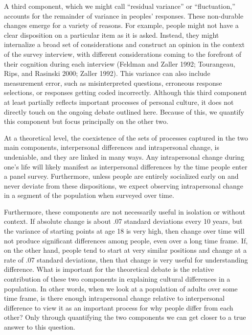 \documentclass[
  12pt,
]{article}
\begin{document}
A third component, which we might call ``residual variance'' or
``fluctuation,'' accounts for the remainder of variance in peoples'
responses. These non-durable changes emerge for a variety of reasons.
For example, people might not have a clear disposition on a particular
item as it is asked. Instead, they might internalize a broad set of
considerations and construct an opinion in the context of the survey
interview, with different considerations coming to the forefront of
their cognition during each interview (Feldman and Zaller 1992;
Tourangeau, Rips, and Rasinski 2000; Zaller 1992). This variance can
also include measurement error, such as misinterpreted questions,
erroneous response selections, or responses getting coded incorrectly.
Although this third component at least partially reflects important
processes of personal culture, it does not directly touch on the ongoing
debate outlined here. Because of this, we quantify this component but
focus principally on the other two.

At a theoretical level, the coexistence of the sets of processes
captured in the two main components, interpersonal differences and
intrapersonal change, is undeniable, and they are linked in many ways.
Any intrapersonal change during one's life will likely manifest as
interpersonal differences by the time people enter a panel survey.
Furthermore, unless people are entirely socialized early on and never
deviate from these dispositions, we expect observing intrapersonal
change in a segment of the population when surveyed over time.

Furthermore, these components are not necessarily useful in isolation or
without context. If absolute change is about .07 standard deviations
every 10 years, but the variance of starting points at age 18 is very
high, then change over time will not produce significant differences
among people, even over a long time frame. If, on the other hand, people
tend to start at very similar positions and change at a rate of .07
standard deviations, then that change is very useful for understanding
difference. What is important for the theoretical debate is the relative
contribution of these two components in explaining cultural differences
in a population. In other words, when we look at a population of adults
over some time frame, is there enough intrapersonal change relative to
interpersonal difference to view it as an important process for why
people differ from each other? Only through quantifying the two
components we can get closer to a true answer to this question.
\end{document}

